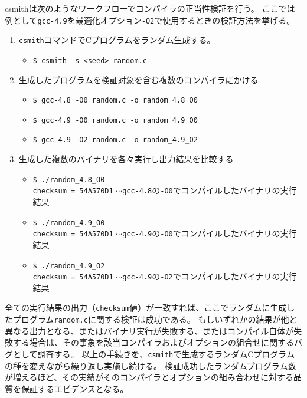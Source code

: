 \par
\acrshort{csmith}は次のようなワークフローでコンパイラの正当性検証を行う。
ここでは例として\verb|gcc-4.9|を最適化オプション\verb|-O2|で使用するときの検証方法を挙げる。
\begin{enumerate}
  \item \verb|csmith|コマンドでCプログラムをランダム生成する。
  \begin{itemize}
    \item[] \verb|$ csmith -s <seed> random.c|
  \end{itemize}
  \item 生成したプログラムを検証対象を含む複数のコンパイラにかける
  \begin{itemize}
    \item[] \verb|$ gcc-4.8 -O0 random.c -o random_4.8_O0|
    \item[] \verb|$ gcc-4.9 -O0 random.c -o random_4.9_O0|
    \item[] \verb|$ gcc-4.9 -O2 random.c -o random_4.9_O2|
  \end{itemize}
  \item 生成した複数のバイナリを各々実行し出力結果を比較する
  \begin{itemize}
    \item[] \verb|$ ./random_4.8_O0|\\\verb|checksum = 54A570D1| $\cdots$\verb|gcc-4.8|の\verb|-O0|でコンパイルしたバイナリの実行結果
    \item[] \verb|$ ./random_4.9_O0|\\\verb|checksum = 54A570D1| $\cdots$\verb|gcc-4.9|の\verb|-O0|でコンパイルしたバイナリの実行結果
    \item[] \verb|$ ./random_4.9_O2|\\\verb|checksum = 54A570D1| $\cdots$\verb|gcc-4.9|の\verb|-O2|でコンパイルしたバイナリの実行結果
  \end{itemize}
\end{enumerate}
\par
全ての実行結果の出力（\verb|checksum|値）が一致すれば、ここでランダムに生成したプログラム\verb|random.c|に関する検証は成功である。
もしいずれかの結果が他と異なる出力となる、またはバイナリ実行が失敗する、またはコンパイル自体が失敗する場合は、その事象を該当コンパイラおよびオプションの組合せに関するバグとして調査する。
以上の手続きを、\verb|csmith|で生成するランダムCプログラムの種を変えながら繰り返し実施し続ける。
検証成功したランダムプログラム数が増えるほど、その実績がそのコンパイラとオプションの組み合わせに対する品質を保証するエビデンスとなる。
